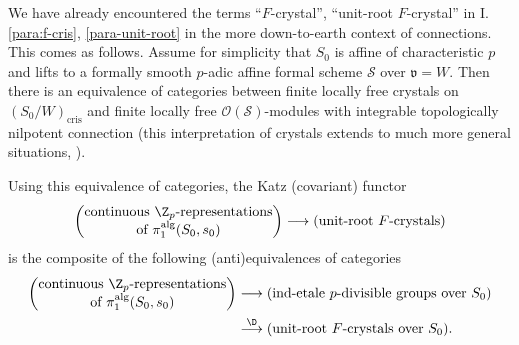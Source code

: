 \begin{para}\label{para:3.4.1}
 We have already encountered the terms ``$F$-crystal'', ``unit-root
 $F$-crystal'' in I.\ref{para:f-cris}, \ref{para-unit-root} in the more
 down-to-earth context of 
 connections. This comes as follows. Assume for simplicity that $S_0$ is
 affine of characteristic $p$ and lifts to a formally smooth $p$-adic
 affine formal scheme $\mathcal{S}$ over $\mathfrak{v}=W$.  Then there
 is an equivalence of categories between finite locally free crystals on
 $(S_0/W)_{\mathrm{cris}}$ and finite locally free
 $\mathcal{O}(\mathcal{S})$-modules with integrable topologically
 nilpotent connection (this interpretation of crystals extends to much
 more general situations, \cf \cite[2.2.2]{jong95:_cryst_dieud}).

 \noindent Using this equivalence of categories, the Katz (covariant) functor
 \begin{equation*}
  \begin{pmatrix}\text{continuous }{\Z}_p\text{-representations} \\
   \text{of } \pi_1^{\mathrm{alg}}(S_0,s_0)
  \end{pmatrix}
  \longrightarrow \text{(unit-root $F$-crystals)}
 \end{equation*}
 is the composite of the following (anti)equivalences of categories
 \begin{align*}
  \begin{pmatrix}\text{continuous } {\Z}_p\text{-representations} \\
   \text{of } \pi_1^{\mathrm{alg}}(S_0,s_0)
  \end{pmatrix}& \longrightarrow
  \text{(ind-etale $p$-divisible groups over $S_0$)}\\
  & \overset{\D}{\longrightarrow}
  \text{(unit-root $F$-crystals over $S_0$)}.
 \end{align*} 
\end{para}

